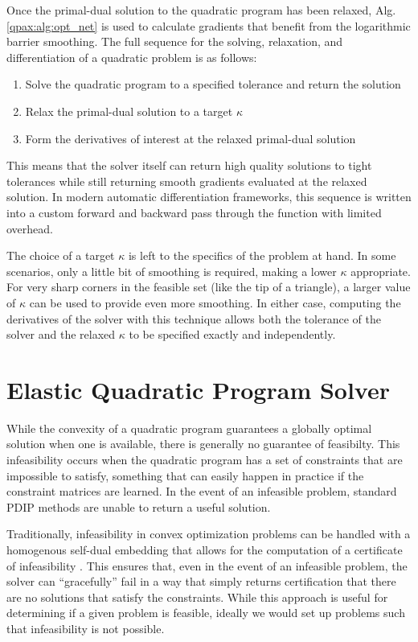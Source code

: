Once the primal-dual solution to the quadratic program has been relaxed, Alg. \eqref{qpax:alg:opt_net} is used to calculate gradients that benefit from the logarithmic barrier smoothing. The full sequence for the solving, relaxation, and differentiation of a quadratic problem is as follows:
\begin{enumerate}
    \item Solve the quadratic program to a specified tolerance and return the solution
    \item Relax the primal-dual solution to a target $\kappa$ 
    \item Form the derivatives of interest at the relaxed primal-dual solution
\end{enumerate}
This means that the solver itself can return high quality solutions to tight tolerances while still returning smooth gradients evaluated at the relaxed solution. In modern automatic differentiation frameworks, this sequence is written into a custom forward and backward pass through the function with limited overhead. 

The choice of a target $\kappa$ is left to the specifics of the problem at hand. In some scenarios, only a little bit of smoothing is required, making a lower $\kappa$ appropriate. For very sharp corners in the feasible set (like the tip of a triangle), a larger value of $\kappa$ can be used to provide even more smoothing. In either case, computing the derivatives of the solver with this technique allows both the tolerance of the solver and the relaxed $\kappa$ to be specified exactly and independently. 
%
%
%
%
%
%
\section{Elastic Quadratic Program Solver}
%
%
%
%
While the convexity of a quadratic program guarantees a globally optimal solution when one is available, there is generally no guarantee of feasibilty. This infeasibility occurs when the quadratic program has a set of constraints that are impossible to satisfy, something that can easily happen in practice if the constraint matrices are learned. In the event of an infeasible problem, standard PDIP methods are unable to return a useful solution. 

Traditionally, infeasibility in convex optimization problems can be handled with a homogenous self-dual embedding that allows for the computation of a certificate of infeasibility \cite{domahidi2013,vandenberghe,stellato}. This ensures that, even in the event of an infeasible problem, the solver can ``gracefully'' fail in a way that simply returns certification that there are no solutions that satisfy the constraints. While this approach is useful for determining if a given problem is feasible, ideally we would set up problems such that infeasibility is not possible. 

